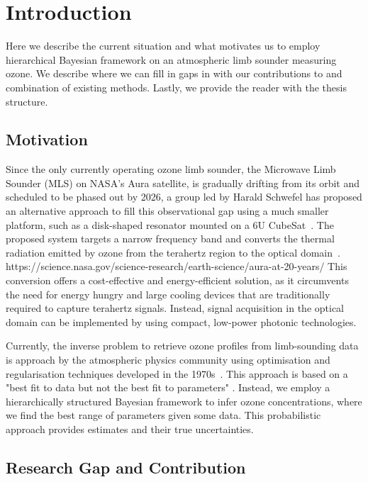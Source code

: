 \chapter{Introduction}
Here we describe the current situation and what motivates us to employ hierarchical Bayesian framework on an atmospheric limb sounder measuring ozone.
We describe where we can fill in gaps in with our contributions to and combination of existing methods.
Lastly, we provide the reader with the thesis structure.

\section{Motivation}
Since the only currently operating ozone limb sounder, the Microwave Limb Sounder (MLS) on NASA's Aura satellite, is gradually drifting from its orbit and scheduled to be phased out by 2026, a group led by Harald Schwefel has proposed an alternative approach to fill this observational gap using a much smaller platform, such as a disk-shaped resonator mounted on a 6U CubeSat~\cite{ustin2024current}. The proposed system targets a narrow frequency band and converts the thermal radiation emitted by ozone from the terahertz region to the optical domain~\cite{}. 
https://science.nasa.gov/science-research/earth-science/aura-at-20-years/
This conversion offers a cost-effective and energy-efficient solution, as it circumvents the need for energy hungry and large cooling devices that are traditionally required to capture terahertz signals. Instead, signal acquisition in the optical domain can be implemented by using compact, low-power photonic technologies.

Currently, the inverse problem to retrieve ozone profiles from limb-sounding data is approach by the atmospheric physics community using optimisation and regularisation techniques developed in the 1970s~\cite{rodgers1976retrieval}.
This approach is based on a "best fit to data but not the best fit to parameters" \cite{tan2016LecNot}.
Instead, we employ a hierarchically structured Bayesian framework to infer ozone concentrations, where we find the best range of parameters given some data.
This probabilistic approach provides estimates and their true uncertainties.

\section{Research Gap and Contribution}


